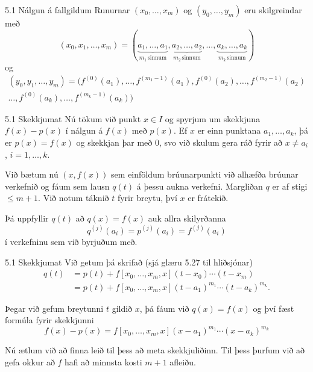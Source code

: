 \begin{frame}{5.1 Nálgun á fallgildum} 
Runurnar $(x_0,\ldots,x_m)$ og 
$(y_0,\ldots,y_m)$ eru skilgreindar með 
\begin{equation*}
  (x_0,x_1,\ldots,x_m) = 
  (\underbrace{a_1, \ldots, a_1}_{m_1 \, \text{sinnum}}, 
  \underbrace{a_2, \ldots , a_2}_{m_2 \, \text{sinnum}}, 
  \ldots , 
  \underbrace{a_k, \ldots , a_k}_{m_k \, \text{sinnum}}) 
\end{equation*}
og
\begin{multline*}
  (y_0,y_1,\ldots,y_m) = 
  (f^{(0)}(a_1), \ldots, f^{(m_1-1)}(a_1),
f^{(0)}(a_2), \ldots, f^{(m_2-1)}(a_2) \\ \ldots,
  f^{(0)}(a_k), \ldots, f^{(m_k-1)}(a_k))
  \label{bru.margfald.5}
\end{multline*}
\end{frame}

\begin{frame}{5.1 Skekkjumat} 
Nú tökum við punkt $x \in I$ og spyrjum um skekkjuna 
$f(x) - p(x)$ í nálgun á $f(x)$ með $p(x)$. Ef $x$ er einn punktana 
$a_1, \ldots, a_k$, þá er $p(x) = f(x)$ og skekkjan þar með 0, svo 
við skulum gera ráð fyrir að $x \not= a_i$, $i = 1, \ldots, k$.

\pause
\smallskip
Við bætum nú $(x,f(x))$ sem einföldum brúunarpunkti við
alhæfða brúunar verkefnið  og fáum sem lausn $q(t)$ á þessu aukna verkefni. 
Margliðan $q$ er af stigi $\leq m+1$. Við notum táknið $t$ fyrir 
breytu, því $x$ er frátekið. 

\pause
\smallskip
Þá uppfyllir $q(t)$ að $q(x) = f(x)$ 
auk allra skilyrðanna 
$$
q^{(j)}(a_i) = p^{(j)}(a_i) = f^{(j)}(a_i)
$$ 
í verkefninu sem við byrjuðum með.
\end{frame}

\begin{frame}{5.1 Skekkjumat} 
Við getum þá skrifað (sjá glæru 5.27 til hliðsjónar)
\begin{align*}
  q(t) &= p(t) + f[x_0,\ldots,x_m,x](t-x_0)\cdots(t-x_m) \\
  &= p(t) + f[x_0,\ldots,x_m,x](t-a_1)^{m_1}\cdots(t-a_k)^{m_k}.
\end{align*}

\pause
Þegar við gefum breytunni $t$ gildið $x$, þá fáum við $q(x) = f(x)$
og  því fæst formúla fyrir skekkjunni
\begin{equation*}
  f(x) - p(x) 
  = f[x_0,\ldots,x_m,x](x-a_1)^{m_1}\cdots(x-a_k)^{m_k}
\end{equation*} 

\pause
Nú ætlum við að finna leið til þess að meta skekkjuliðinn. 
Til þess þurfum við að gefa okkur að $f$ hafi að minnsta kosti 
$m+1$ afleiðu.
\end{frame}

